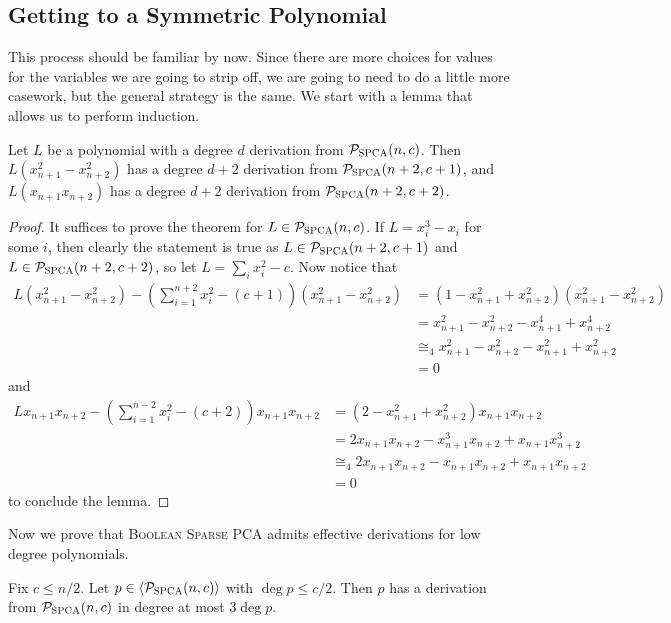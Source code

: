 \subsection{Getting to a Symmetric Polynomial}
This process should be familiar by now. Since there are more choices for values for the variables we are going to strip off, we are going to need to do a little more casework, but the general strategy is the same. We start with a lemma that allows us to perform induction.
\begin{lemma}\label{lem:bpca-induct}
Let $L$ be a polynomial with a degree $d$ derivation from $\mathcal P_{\textsc{SPCA}}(n,c)$. Then $L(x_{n+1}^2-x_{n+2}^2)$ has a degree $d+2$ derivation from $\mathcal P_{\textsc{SPCA}}(n+2,c+1)$, and $L(x_{n+1}x_{n+2})$ has a degree $d+2$ derivation from $\mathcal P_{\textsc{SPCA}}(n+2,c+2)$.
\end{lemma}
\begin{proof}
It suffices to prove the theorem for $L \in \mathcal P_{\textsc{SPCA}}(n,c)$. If $L = x_i^3 - x_i$ for some $i$, then clearly the statement is true as $L \in \mathcal P_{\textsc{SPCA}}(n+2,c+1)$ and $L \in \mathcal P_{\textsc{SPCA}}(n+2,c+2)$, so let $L = \sum_i x_i^2 - c$. Now notice that 
\begin{align*}
L(x_{n+1}^2 - x_{n+2}^2) - \left(\sum_{i=1}^{n+2} x_i^2 - (c+1)\right)(x_{n+1}^2-x_{n+2}^2) &= (1-x_{n+1}^2+x_{n+2}^2)(x_{n+1}^2-x_{n+2}^2) \\
&= x_{n+1}^2 - x_{n+2}^2 - x_{n+1}^4 + x_{n+2}^4  \\
&\cong_4 x_{n+1}^2 - x_{n+2}^2 - x_{n+1}^2 + x_{n+2}^2 \\
&= 0
\end{align*}
and 
\begin{align*}
Lx_{n+1}x_{n+2} - \left(\sum_{i=1}^{n-2} x_i^2 - (c+2)\right)x_{n+1}x_{n+2} &= (2-x_{n+1}^2 + x_{n+2}^2)x_{n+1}x_{n+2} \\
&= 2x_{n+1}x_{n+2} - x_{n+1}^3x_{n+2} + x_{n+1}x_{n+2}^3 \\
&\cong_4 2x_{n+1}x_{n+2} - x_{n+1}x_{n+2} + x_{n+1}x_{n+2} \\
&= 0
\end{align*}
to conclude the lemma. 
\end{proof}
Now we prove that \textsc{Boolean Sparse PCA} admits effective derivations for low degree polynomials.
\begin{lemma}
Fix $c \leq n/2$. Let $p \in \langle \mathcal P_{\textsc{SPCA}}(n,c) \rangle$ with $\deg p \leq c/2$. Then $p$ has a derivation from $\mathcal P_{\textsc{SPCA}}(n,c)$ in degree at most $3\deg p$.
\end{lemma}
